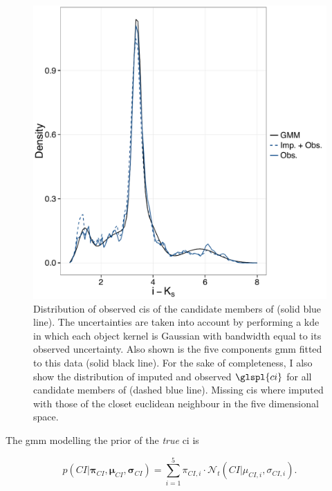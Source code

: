 \begin{figure}[ht!]
\begin{center}
\includegraphics[page=1,width=\textwidth]{background/Figures/BIC_Color_fit.pdf}
\caption{Distribution of observed \glspl{ci} of the candidate members of \citet{Bouy2015} (solid blue line). The uncertainties are taken into account by performing a \gls{kde} in which each object kernel is Gaussian with bandwidth equal to its observed uncertainty. Also shown is the five components \gls{gmm} fitted to this data (solid black line). For the sake of completeness, I also show the distribution of imputed and observed $\glspl{ci}$ for all candidate members of \citet{Bouy2015} (dashed blue line). Missing \glspl{ci} where imputed with those of the closet euclidean neighbour in the five dimensional space.}
\label{fig:fitCI}
\end{center}
\end{figure}



The \gls{gmm} modelling the prior of the \emph{true} \gls{ci} is 

\begin{equation}
\label{eq:colordist}
p(CI|\boldsymbol{\pi}_{CI},\boldsymbol{\mu}_{CI},\boldsymbol{\sigma}_{CI})= \sum_{i=1}^5 \pi_{CI,i} \cdot \mathcal{N}_t(CI| \mu_{CI,i},\sigma_{CI,i}).
\end{equation}

